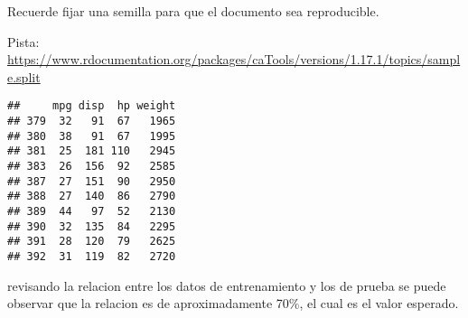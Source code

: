 \documentclass[]{article}
\newenvironment{Shaded}{\begin{snugshade}}{\end{snugshade}}
\newcommand{\DataTypeTok}[1]{\textcolor[rgb]{0.13,0.29,0.53}{#1}}
\newcommand{\DecValTok}[1]{\textcolor[rgb]{0.00,0.00,0.81}{#1}}
\newcommand{\KeywordTok}[1]{\textcolor[rgb]{0.13,0.29,0.53}{\textbf{#1}}}
\newcommand{\NormalTok}[1]{#1}
\newcommand{\OperatorTok}[1]{\textcolor[rgb]{0.81,0.36,0.00}{\textbf{#1}}}
\newcommand{\StringTok}[1]{\textcolor[rgb]{0.31,0.60,0.02}{#1}}
\begin{document}
Recuerde fijar una semilla para que el documento sea reproducible.

Pista:
\url{https://www.rdocumentation.org/packages/caTools/versions/1.17.1/topics/sample.split}

\begin{Shaded}
\end{Shaded}

\begin{verbatim}
##     mpg disp  hp weight
## 379  32   91  67   1965
## 380  38   91  67   1995
## 381  25  181 110   2945
## 383  26  156  92   2585
## 387  27  151  90   2950
## 388  27  140  86   2790
## 389  44   97  52   2130
## 390  32  135  84   2295
## 391  28  120  79   2625
## 392  31  119  82   2720
\end{verbatim}

revisando la relacion entre los datos de entrenamiento y los de prueba
se puede observar que la relacion es de aproximadamente 70\%, el cual es
el valor esperado.

\begin{Shaded}
\end{Shaded}
\end{document}
